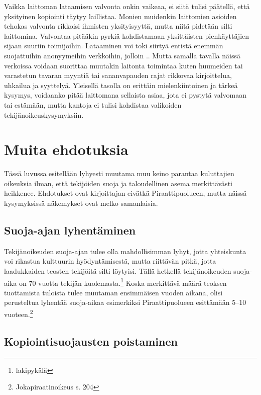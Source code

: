 \documentclass[titlepage,12pt]{article}
\begin{document}
Vaikka laittoman lataamisen valvonta onkin vaikeaa, ei siitä tulisi
päätellä, että yksityinen kopiointi täytyy laillistaa.  Monien
muidenkin laittomien asioiden tehokas valvonta rikkoisi ihmisten
yksityisyyttä, mutta niitä pidetään silti laittomina.  Valvontaa
pitääkin pyrkiä kohdistamaan yksittäisten pienkäyttäjien sijaan
suuriin toimijoihin.  Lataaminen voi toki siirtyä entistä enemmän
suojattuihin anonyymeihin verkkoihin, jolloin ..  Mutta samalla
tavalla näissä verkoissa voidaan suorittaa muutakin laitonta toimintaa
kuten huumeiden tai varastetun tavaran myyntiä tai sananvapauden rajat
rikkovaa kirjoittelua, uhkailua ja syyttelyä.  Yleisellä tasolla on
erittäin mielenkiintoinen ja tärkeä kysymys, voidaanko pitää
laittomana sellaista asiaa, jota ei pystytä valvomaan tai estämään,
mutta kantoja ei tulisi kohdistaa valikoiden tekijänoikeuskysymyksiin.

\section{Muita ehdotuksia}

Tässä luvussa esitellään lyhyesti muutama muu keino parantaa
kuluttajien oikeuksia ilman, että tekijöiden suoja ja taloudellinen
asema merkittävästi heikkenee.  Ehdotukset ovat kirjoittajan eivätkä
Piraattipuolueen, mutta näissä kysymyksissä näkemykset ovat melko
samanlaisia.

\subsection{Suoja-ajan lyhentäminen}

Tekijänoikeuden suoja-ajan tulee olla mahdollisimman lyhyt, jotta
yhteiskunta voi rikastua kulttuurin hyödyntämisestä, mutta riittävän
pitkä, jotta laadukkaiden teosten tekijöitä silti löytyisi.  Tällä
hetkellä tekijänoikeuden suoja-aika on 70 vuotta tekijän
kuolemasta.\footnote{lakipykälä} Koska merkittävä määrä teoksen
tuottamista tuloista tulee muutaman ensimmäisen vuoden aikana, olisi
perusteltua lyhentää suoja-aikaa esimerkiksi Piraattipuolueen
esittämään 5--10 vuoteen.\footnote{Jokapiraatinoikeus s. 204}


\subsection{Kopiointisuojausten poistaminen}
\end{document}
